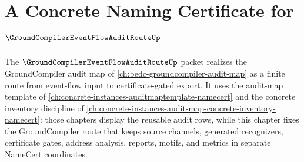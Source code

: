 \chapter{A Concrete Naming Certificate for $\GroundCompilerEventFlowAuditRouteUp$}
\label{ch:concrete-instances-groundcompilereventflowauditroute-namecert}

The $\GroundCompilerEventFlowAuditRouteUp$ packet realizes the GroundCompiler audit map of \autoref{ch:bedc-groundcompiler-audit-map} as a finite route from event-flow input to certificate-gated export. It uses the audit-map template of \autoref{ch:concrete-instances-auditmaptemplate-namecert} and the concrete inventory discipline of \autoref{ch:concrete-instances-audit-map-concrete-inventory-namecert}: those chapters display the reusable audit rows, while this chapter fixes the GroundCompiler route that keeps source channels, generated recognizers, certificate gates, address analysis, reports, motifs, and metrics in separate NameCert coordinates.

